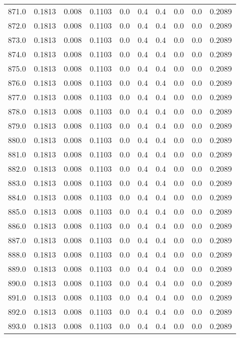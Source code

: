 \begin{longtable}{lrrrrrrrrr}
871.0 & 0.1813 & 0.008 & 0.1103 & 0.0 & 0.4 & 0.4 & 0.0 & 0.0 & 0.2089 \\
872.0 & 0.1813 & 0.008 & 0.1103 & 0.0 & 0.4 & 0.4 & 0.0 & 0.0 & 0.2089 \\
873.0 & 0.1813 & 0.008 & 0.1103 & 0.0 & 0.4 & 0.4 & 0.0 & 0.0 & 0.2089 \\
874.0 & 0.1813 & 0.008 & 0.1103 & 0.0 & 0.4 & 0.4 & 0.0 & 0.0 & 0.2089 \\
875.0 & 0.1813 & 0.008 & 0.1103 & 0.0 & 0.4 & 0.4 & 0.0 & 0.0 & 0.2089 \\
876.0 & 0.1813 & 0.008 & 0.1103 & 0.0 & 0.4 & 0.4 & 0.0 & 0.0 & 0.2089 \\
877.0 & 0.1813 & 0.008 & 0.1103 & 0.0 & 0.4 & 0.4 & 0.0 & 0.0 & 0.2089 \\
878.0 & 0.1813 & 0.008 & 0.1103 & 0.0 & 0.4 & 0.4 & 0.0 & 0.0 & 0.2089 \\
879.0 & 0.1813 & 0.008 & 0.1103 & 0.0 & 0.4 & 0.4 & 0.0 & 0.0 & 0.2089 \\
880.0 & 0.1813 & 0.008 & 0.1103 & 0.0 & 0.4 & 0.4 & 0.0 & 0.0 & 0.2089 \\
881.0 & 0.1813 & 0.008 & 0.1103 & 0.0 & 0.4 & 0.4 & 0.0 & 0.0 & 0.2089 \\
882.0 & 0.1813 & 0.008 & 0.1103 & 0.0 & 0.4 & 0.4 & 0.0 & 0.0 & 0.2089 \\
883.0 & 0.1813 & 0.008 & 0.1103 & 0.0 & 0.4 & 0.4 & 0.0 & 0.0 & 0.2089 \\
884.0 & 0.1813 & 0.008 & 0.1103 & 0.0 & 0.4 & 0.4 & 0.0 & 0.0 & 0.2089 \\
885.0 & 0.1813 & 0.008 & 0.1103 & 0.0 & 0.4 & 0.4 & 0.0 & 0.0 & 0.2089 \\
886.0 & 0.1813 & 0.008 & 0.1103 & 0.0 & 0.4 & 0.4 & 0.0 & 0.0 & 0.2089 \\
887.0 & 0.1813 & 0.008 & 0.1103 & 0.0 & 0.4 & 0.4 & 0.0 & 0.0 & 0.2089 \\
888.0 & 0.1813 & 0.008 & 0.1103 & 0.0 & 0.4 & 0.4 & 0.0 & 0.0 & 0.2089 \\
889.0 & 0.1813 & 0.008 & 0.1103 & 0.0 & 0.4 & 0.4 & 0.0 & 0.0 & 0.2089 \\
890.0 & 0.1813 & 0.008 & 0.1103 & 0.0 & 0.4 & 0.4 & 0.0 & 0.0 & 0.2089 \\
891.0 & 0.1813 & 0.008 & 0.1103 & 0.0 & 0.4 & 0.4 & 0.0 & 0.0 & 0.2089 \\
892.0 & 0.1813 & 0.008 & 0.1103 & 0.0 & 0.4 & 0.4 & 0.0 & 0.0 & 0.2089 \\
893.0 & 0.1813 & 0.008 & 0.1103 & 0.0 & 0.4 & 0.4 & 0.0 & 0.0 & 0.2089 \\

\end{longtable}
